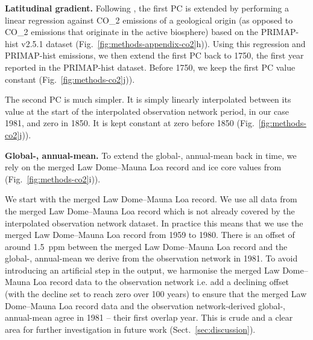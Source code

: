 \textbf{Latitudinal gradient.}
Following \cite{meinshausen_historical-ghgs_2017},
the first PC is extended by performing a linear regression against CO_2 emissions of a geological origin
(as opposed to CO_2 emissions that originate in the active biosphere)
based on the PRIMAP-hist v2.5.1 dataset \citep{gutschow_primap-hist-dataset_2024,gutschow_primap-hist_2016} (Fig.~\ref{fig:methods-appendix-co2}h)).
Using this regression and PRIMAP-hist emissions, we then extend the first PC back to 1750,
the first year reported in the PRIMAP-hist dataset.
Before 1750, we keep the first PC value constant (Fig.~\ref{fig:methods-co2}j)).

The second PC is much simpler.
It is simply linearly interpolated between its value at the start of
the interpolated observation network period, in our case 1981, and zero in 1850.
It is kept constant at zero before 1850 (Fig.~\ref{fig:methods-co2}j)).

\textbf{Global-, annual-mean.}
To extend the global-, annual-mean back in time, we rely on the
merged Law Dome--Mauna Loa record \citep{keeling_co2-exchanges_2001,rubino_law-dome-dataset_2019,etheridge_law-dome-co2_1996,macfarling-meure_law-dome_2006} and ice core values from \citet{menking_law-dome_2025}
(Fig.~\ref{fig:methods-co2}i)).

We start with the merged Law Dome--Mauna Loa record.
We use all data from the merged Law Dome--Mauna Loa record which is not already covered by the interpolated observation network dataset.
In practice this means that we use the merged Law Dome--Mauna Loa record from 1959 to 1980.
There is an offset of around 1.5~ppm between the merged Law Dome--Mauna Loa record
and the global-, annual-mean we derive from the observation network in 1981.
To avoid introducing an artificial step in the output,
we harmonise the merged Law Dome--Mauna Loa record data to the observation network
i.e. add a declining offset (with the decline set to reach zero over 100 years)
to ensure that the merged Law Dome--Mauna Loa record data and the observation network-derived
global-, annual-mean agree in 1981 -- their first overlap year.
This is crude and a clear area for further investigation in future work (Sect.~\ref{sec:discussion}).

